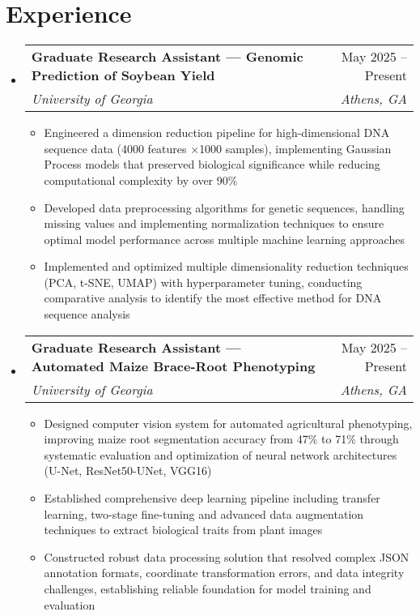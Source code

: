 \documentclass[letterpaper,10.5pt]{article}
\makeatletter
\newcommand{\resumeItem}[1]{
  \item\small{
    {#1 \vspace{-3pt}}
  }
}
\newcommand{\resumeSubheading}[4]{
  \vspace{-2pt}\item
    \begin{tabular*}{0.97\textwidth}{l@{\extracolsep{\fill}}r}
      \textbf{#1} & #2 \\
      \textit{\small#3} & \textit{\small #4} \\
    \end{tabular*}\vspace{-6pt}
}
\newcommand{\resumeSubHeadingListStart}{\begin{itemize}[leftmargin=*]}
\newcommand{\resumeSubHeadingListEnd}{\end{itemize}}
\newcommand{\resumeItemListStart}{\begin{itemize}}
\newcommand{\resumeItemListEnd}{\end{itemize}\vspace{-6pt}}
\makeatother
\begin{document}
\section{Experience}
  \resumeSubHeadingListStart
    \resumeSubheading
      {Graduate Research Assistant — Genomic Prediction of Soybean Yield}{May 2025 -- Present}
      {University of Georgia}{Athens, GA}
      \resumeItemListStart
        \resumeItem{Engineered a dimension reduction pipeline for high-dimensional DNA sequence data (4000 features $\times$1000 samples), implementing Gaussian Process models that preserved biological significance while reducing computational complexity by over 90\%}
        \resumeItem{Developed data preprocessing algorithms for genetic sequences, handling missing values and implementing normalization techniques to ensure optimal model performance across multiple machine learning approaches}
        \resumeItem{Implemented and optimized multiple dimensionality reduction techniques (PCA, t-SNE, UMAP) with hyperparameter tuning, conducting comparative analysis to identify the most effective method for DNA sequence analysis}
      \resumeItemListEnd
      
    \resumeSubheading
      {Graduate Research Assistant — Automated Maize Brace-Root Phenotyping}{May 2025 -- Present}
      {University of Georgia}{Athens, GA}
      \resumeItemListStart
        \resumeItem{Designed computer vision system for automated agricultural phenotyping, improving maize root segmentation accuracy from 47\% to 71\% through systematic evaluation and optimization of neural network architectures (U-Net, ResNet50-UNet, VGG16)}
        \resumeItem{Established comprehensive deep learning pipeline including transfer learning, two-stage fine-tuning and advanced data augmentation techniques to extract biological traits from plant images}
        \resumeItem{Constructed robust data processing solution that resolved complex JSON annotation formats, coordinate transformation errors, and data integrity challenges, establishing reliable foundation for model training and evaluation}
      \resumeItemListEnd
  \resumeSubHeadingListEnd

\end{document}
